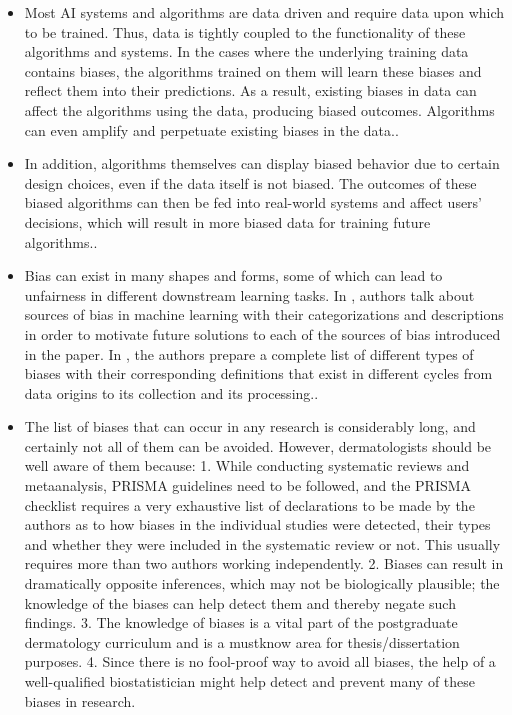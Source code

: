 \documentclass[12pt, a4paper, oneside]{book}   	%
\newif\ifrawcitationactive
\newcommand{\rawcitationend}{
	\color{black}\rawcitationactivefalse
}
\begin{document}
			\begin{itemize}
				\item Most AI systems and algorithms are data driven and require data upon which to be trained. Thus, data is tightly coupled to the functionality of these algorithms and systems. In the cases where the underlying training data contains biases, the algorithms trained on them will learn these biases and reflect them into their predictions. As a result, existing biases in data can affect the algorithms using the data, producing biased outcomes. Algorithms can even amplify and perpetuate existing biases in the data.\autocite{Mehrabi_2021}.
				\item In addition, algorithms themselves can display biased behavior due to certain design choices, even if the data itself is not biased. The outcomes of these biased algorithms can then be fed into real-world systems and affect users’ decisions, which will result in more biased data for training future algorithms.\autocite{Mehrabi_2021}.
				
				\item Bias can exist in many shapes and forms, some of which can lead to unfairness in different downstream learning tasks. In \autocite{M144_Suresh_2021}, authors talk about sources of bias in machine learning with their categorizations and descriptions in order to motivate future solutions to each of the sources of bias introduced in the paper. In \autocite{M120_Olteanu_2019}, the authors prepare a complete list of different types of biases with their corresponding definitions that exist in different cycles from data origins to its collection and its processing.\autocite{Mehrabi_2021}.
			\end{itemize}	
			
			\begin{itemize}
				\item The list of biases that can occur in any research is considerably long, and certainly not all of them can be avoided. However, dermatologists should be well aware of them because: 1. While conducting systematic reviews and metaanalysis, PRISMA guidelines need to be followed, and the PRISMA checklist requires a very exhaustive list of declarations to be made by the authors as to how biases in the individual studies were detected, their types and whether they were included in the systematic review or not. This usually requires more than two authors working independently. 2. Biases can result in dramatically opposite inferences, which may not be biologically plausible; the knowledge of the biases can help detect them and thereby negate such findings. 3. The knowledge of biases is a vital part of the postgraduate dermatology curriculum and is a mustknow area for thesis/dissertation purposes. 4. Since there is no fool-proof way to avoid all biases, the help of a well-qualified biostatistician might help detect and prevent many of these biases in research. \autocite{Chakraborty_2024}
			\end{itemize}
			\rawcitationend
			
\end{document}
